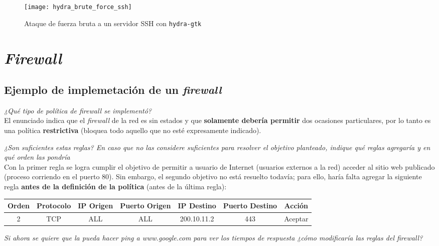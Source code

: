 \begin{figure}[h]
    \centering
    \texttt{[image: hydra\_brute\_force\_ssh]}
    \caption{Ataque de fuerza bruta a un servidor SSH con \texttt{hydra-gtk}}
\end{figure}


\section{\emph{Firewall}}


\subsection{Ejemplo de implemetación de un \emph{firewall}}

\emph{¿Qué tipo de política de firewall se implementó?} 
~\\

El enunciado indica que el \emph{firewall} de la red es sin estados y que \textbf{solamente debería permitir} dos ocasiones particulares, por lo tanto es una política \textbf{restrictiva} (bloquea todo aquello que no esté expresamente indicado).   

\emph{¿Son suficientes estas reglas? En caso que no las considere suficientes para resolver el objetivo planteado, indique qué reglas agregaría y en qué orden las pondría} 
~\\

Con la primer regla se logra cumplir el objetivo de permitir a usuario de Internet (usuarios externos a la red) acceder al sitio web publicado (proceso corriendo en el puerto 80). Sin embargo, el segundo objetivo no está resuelto todavía; para ello, haría falta agregar la siguiente regla \textbf{antes de la definición de la política} (antes de la última regla):

\begin{center}
  \begin{tabular}{ | c | c | c | c | c | c | c | }
    \hline
    Orden & Protocolo & IP Origen & Puerto Origen & IP Destino & Puerto Destino & Acción \\
    \hline
    2 & TCP & ALL & ALL & 200.10.11.2 & 443 & Aceptar \\
    \hline
  \end{tabular}
\end{center}

\emph{Si ahora se quiere que la  pueda hacer ping a \emph{www.google.com} para ver los tiempos de respuesta ¿cómo modificaría las reglas del firewall?} 
~\\

